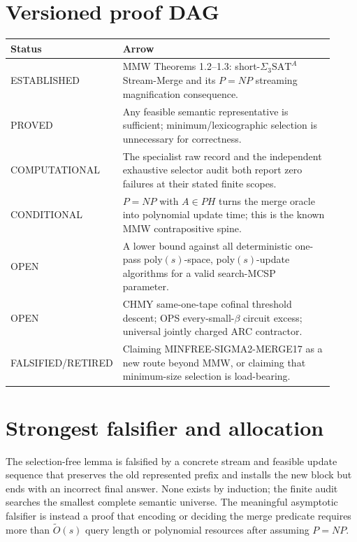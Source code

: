 \documentclass[11pt]{article}
\begin{document}
\section*{Versioned proof DAG}
\begin{center}
\begin{tabular}{p{0.18\linewidth}p{0.74\linewidth}}
\toprule
Status & Arrow \\
\midrule
ESTABLISHED & MMW Theorems 1.2--1.3: short-$\Sigma_3\mathrm{SAT}^A$ Stream-Merge and its $P=NP$ streaming magnification consequence. \\
PROVED & Any feasible semantic representative is sufficient; minimum/lexicographic selection is unnecessary for correctness. \\
COMPUTATIONAL & The specialist raw record and the independent exhaustive selector audit both report zero failures at their stated finite scopes. \\
CONDITIONAL & $P=NP$ with $A\in PH$ turns the merge oracle into polynomial update time; this is the known MMW contrapositive spine. \\
OPEN & A lower bound against all deterministic one-pass poly$(s)$-space, poly$(s)$-update algorithms for a valid search-MCSP parameter. \\
OPEN & CHMY same-one-tape cofinal threshold descent; OPS every-small-$\beta$ circuit excess; universal jointly charged ARC contractor. \\
FALSIFIED/RETIRED & Claiming MINFREE-SIGMA2-MERGE17 as a new route beyond MMW, or claiming that minimum-size selection is load-bearing. \\
\bottomrule
\end{tabular}
\end{center}

\section*{Strongest falsifier and allocation}
The selection-free lemma is falsified by a concrete stream and feasible update sequence that preserves the old represented prefix and installs the new block but ends with an incorrect final answer.  None exists by induction; the finite audit searches the smallest complete semantic universe.  The meaningful asymptotic falsifier is instead a proof that encoding or deciding the merge predicate requires more than $\widetilde O(s)$ query length or polynomial resources after assuming $P=NP$.
\end{document}
